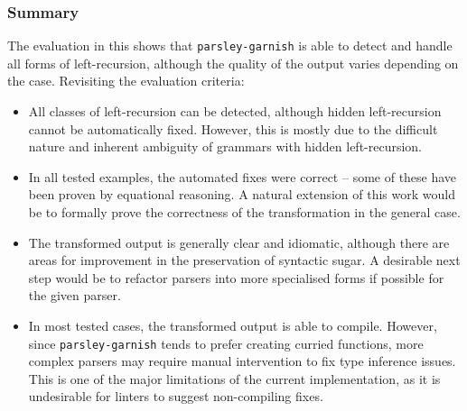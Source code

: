 \documentclass[../../main.tex]{subfiles}
\begin{document}
\subsubsection*{Summary}
The evaluation in this  shows that \texttt{parsley-garnish} is able to detect and handle all forms of left-recursion, although the quality of the output varies depending on the case.
Revisiting the evaluation criteria:
\begin{itemize}
  \item All classes of left-recursion can be detected, although hidden left-recursion cannot be automatically fixed. However, this is mostly due to the difficult nature and inherent ambiguity of grammars with hidden left-recursion.
  \item In all tested examples, the automated fixes were correct -- some of these have been proven by equational reasoning. A natural extension of this work would be to formally prove the correctness of the transformation in the general case.
  \item The transformed output is generally clear and idiomatic, although there are areas for improvement in the preservation of syntactic sugar. A desirable next step would be to refactor  parsers into more specialised forms if possible for the given parser.
  \item In most tested cases, the transformed output is able to compile. However, since \texttt{parsley-garnish} tends to prefer creating curried functions, more complex parsers may require manual intervention to fix type inference issues. This is one of the major limitations of the current implementation, as it is undesirable for linters to suggest non-compiling fixes.
\end{itemize}
\end{document}
